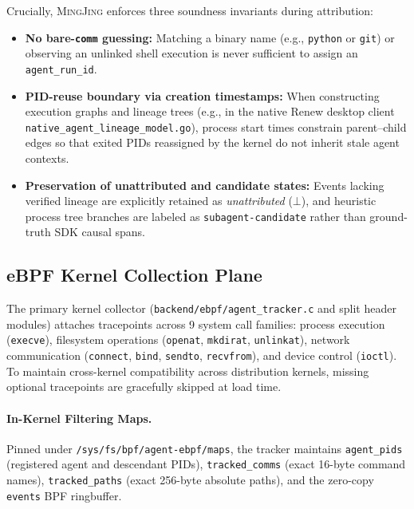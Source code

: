 \documentclass[10pt,twocolumn,letterpaper]{article}
\newcommand{\sys}{\textsc{MingJing}}
\newcommand{\code}[1]{\texttt{\small #1}}
\begin{document}
Crucially, \sys{} enforces three soundness invariants during attribution:
\begin{itemize}
  \item \textbf{No bare-\code{comm} guessing:} Matching a binary name (e.g., \code{python} or \code{git}) or observing an unlinked shell execution is never sufficient to assign an \code{agent\_run\_id}.
  \item \textbf{PID-reuse boundary via creation timestamps:} When constructing execution graphs and lineage trees (e.g., in the native Renew desktop client \code{native\_agent\_lineage\_model.go}), process start times constrain parent--child edges so that exited PIDs reassigned by the kernel do not inherit stale agent contexts.
  \item \textbf{Preservation of unattributed and candidate states:} Events lacking verified lineage are explicitly retained as \emph{unattributed} ($\bot$), and heuristic process tree branches are labeled as \code{subagent-candidate} rather than ground-truth SDK causal spans.
\end{itemize}

\subsection{eBPF Kernel Collection Plane}
The primary kernel collector (\code{backend/ebpf/agent\_tracker.c} and split header modules) attaches tracepoints across 9 system call families: process execution (\code{execve}), filesystem operations (\code{openat}, \code{mkdirat}, \code{unlinkat}), network communication (\code{connect}, \code{bind}, \code{sendto}, \code{recvfrom}), and device control (\code{ioctl}). To maintain cross-kernel compatibility across distribution kernels, missing optional tracepoints are gracefully skipped at load time.

\paragraph{In-Kernel Filtering Maps.} Pinned under \code{/sys/fs/bpf/agent-ebpf/maps}, the tracker maintains \code{agent\_pids} (registered agent and descendant PIDs), \code{tracked\_comms} (exact 16-byte command names), \code{tracked\_paths} (exact 256-byte absolute paths), and the zero-copy \code{events} BPF ringbuffer.
\end{document}
